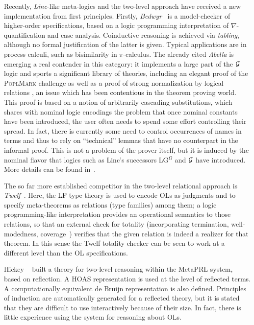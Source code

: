 \documentclass[final]{svjour3}
\begin{document}
Recently, \emph{Linc}-like meta-logics and the two-level approach have
received a new implementation from first principles. Firstly,
\emph{Bedwyr}~\cite{Bedwyr} is a model-checker of higher-order
specifications, based on a logic programming interpretation of
$\nabla$-quantification and case analysis. Coinductive reasoning is
achieved via \emph{tabling}, although no formal justification of the
latter is given. Typical applications are in process calculi, such as
bisimilarity in $\pi$-calculus. The already cited \emph{Abella}
\cite{Abella} is emerging a real contender in this category: it
implements a large part of the $\cal G$ logic and sports a significant
library of theories, including an elegant proof of the
\textsc{PoplMark} challenge \cite{poplmark2005} as well as a proof of
strong normalization by logical relations \cite{AbellaSOS}, an issue
which has been contentious in the theorem proving world.  This proof
is based on a notion of arbitrarily cascading substitutions, which
shares with nominal logic encodings the problem that once nominal
constants have been introduced, the user often needs to spend some
effort controlling their spread.  In fact, there is currently some
need to control occurrences of names in terms and thus to rely on
``technical'' lemmas that have no counterpart in the informal
proof. This is not a problem of the prover itself, but it is induced
by the nominal flavor that logics such as Linc's successors
LG$^\Omega$ and $\cal G$ have introduced. More details can be found
in~\cite{FeltyM09}.

\smallskip

 The so far more established competitor in the two-level relational
 approach is \emph{Twelf}~\cite{TwelfSP}.
Here, the LF type theory is used to encode OLs as judgments
and to specify meta-theorems as relations (type families) among them;
a logic programming-like interpretation provides an operational
semantics to those relations, so that an external check for totality
(incorporating termination, well-modedness,
coverage~\cite{SchurmannP03,Pientka05}) verifies that the given
relation is indeed a realizer for that theorem.  In this sense the
Twelf totality checker can be seen to work at a different level than
the OL specifications.

Hickey \etal~\cite{HickeyNYK06} built a theory for two-level reasoning
within the MetaPRL system, based on reflection.  A HOAS representation
is used at the level of reflected terms. A computationally equivalent
de Bruijn representation is also defined.  Principles of induction are
automatically generated for a reflected theory, but it is stated that
they are difficult to use interactively because of their size.  In
fact, there is little experience using the system for reasoning about
OLs. 
\end{document}
